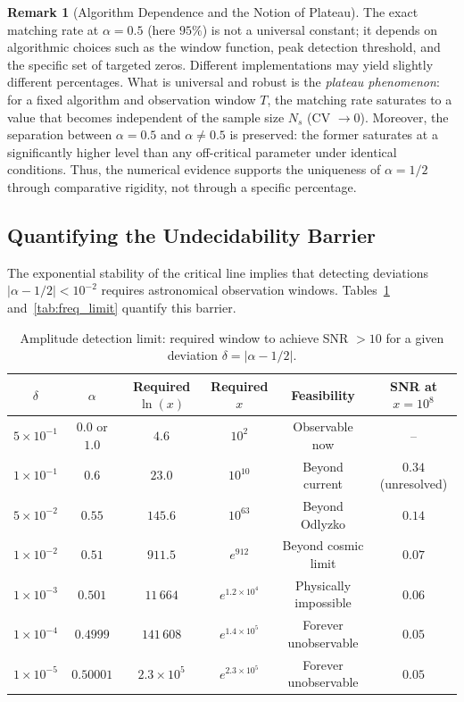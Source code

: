 \documentclass[12pt,a4paper]{article}
\theoremstyle{definition}
\newtheorem{remark}{Remark}[section]
\theoremstyle{plain}
\theoremstyle{remark}
\begin{document}
\begin{remark}[Algorithm Dependence and the Notion of Plateau]\label{rem:algorithm}
The exact matching rate at $\alpha=0.5$ (here $95\%$) is not a universal constant; it depends on algorithmic choices such as the window function, peak detection threshold, and the specific set of targeted zeros. Different implementations may yield slightly different percentages. What is universal and robust is the \textit{plateau phenomenon}: for a fixed algorithm and observation window $T$, the matching rate saturates to a value that becomes independent of the sample size $N_s$ (CV $\to 0$). Moreover, the separation between $\alpha=0.5$ and $\alpha\neq 0.5$ is preserved: the former saturates at a significantly higher level than any off-critical parameter under identical conditions. Thus, the numerical evidence supports the uniqueness of $\alpha=1/2$ through comparative rigidity, not through a specific percentage.
\end{remark}

\subsection{Quantifying the Undecidability Barrier}
The exponential stability of the critical line implies that detecting deviations $|\alpha-1/2| < 10^{-2}$ requires astronomical observation windows. Tables~\ref{tab:amp_limit} and~\ref{tab:freq_limit} quantify this barrier.

\begin{table}[H]
\centering
\caption{Amplitude detection limit: required window to achieve SNR $>10$ for a given deviation $\delta = |\alpha-1/2|$.}
\label{tab:amp_limit}
\begin{tabular}{@{}cccccc@{}} \toprule
$\delta$ & $\alpha$ & Required $\ln(x)$ & Required $x$ & Feasibility & SNR at $x=10^8$ \\ \midrule
$5\times10^{-1}$ & $0.0$ or $1.0$ & $4.6$ & $10^2$      & Observable now      & -- \\
$1\times10^{-1}$ & $0.6$          & $23.0$ & $10^{10}$   & Beyond current      & $0.34$ (unresolved) \\
$5\times10^{-2}$ & $0.55$         & $145.6$ & $10^{63}$  & Beyond Odlyzko      & $0.14$ \\
$1\times10^{-2}$ & $0.51$         & $911.5$ & $e^{912}$  & Beyond cosmic limit & $0.07$ \\
$1\times10^{-3}$ & $0.501$        & $11\,664$ & $e^{1.2\times10^4}$ & Physically impossible & $0.06$ \\
$1\times10^{-4}$ & $0.4999$       & $141\,608$ & $e^{1.4\times10^5}$ & Forever unobservable & $0.05$ \\
$1\times10^{-5}$ & $0.50001$      & $2.3\times10^5$ & $e^{2.3\times10^5}$ & Forever unobservable & $0.05$ \\ \bottomrule
\end{tabular}
\end{table}
\end{document}
